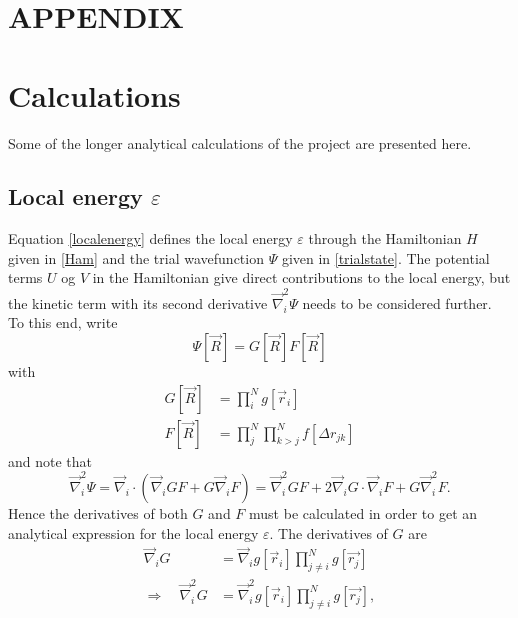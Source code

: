 \documentclass[a4paper,8pt]{article}
\begin{document}




\newpage
\appendix
\setcounter{equation}{0}
\renewcommand{\theequation}{\thesection\arabic{equation}}
\section*{APPENDIX}
\section{Calculations}
Some of the longer analytical calculations of the project are presented here.


\subsection{Local energy $\varepsilon$}\label{derLocalenergy}
Equation \eqref{localenergy} defines the local energy $\varepsilon$ through the Hamiltonian $H$ given in \eqref{Ham} and the trial wavefunction $\Psi$ given in \eqref{trialstate}. The potential terms $U$ og $V$ in the Hamiltonian give direct contributions to the local energy, but the kinetic term with its second derivative $\vec{\nabla}_i^2\Psi$ needs to be considered further. To this end, write
\begin{equation}
\Psi[\vec{R}] = G[\vec{R}]F[\vec{R}]
\end{equation}
with
\begin{align}
G[\vec{R}] &= \prod\limits_i^N g[\vec{r}_i] \label{G}\\
F[\vec{R}] &= \prod\limits_j^N\prod\limits_{k > j}^N f[\Delta{r}_{jk}] \label{F}
\end{align}
and note that
\begin{equation}
\vec{\nabla}_i^2\Psi = \vec{\nabla}_i\cdot\left(\vec{\nabla}_i G F + G \vec{\nabla}_i F\right) = \vec{\nabla}_i^2 G F + 2\vec{\nabla}_i G \cdot \vec{\nabla}_i F + G \vec{\nabla}_i^2 F. \label{Lap_Psi_1} 
\end{equation}
Hence the derivatives of both $G$ and $F$ must be calculated in order to get an analytical expression for the local energy $\varepsilon$. The derivatives of $G$ are 
\begin{align}
\vec{\nabla}_i G &= \vec{\nabla}_i g[\vec{r}_i] \prod\limits_{j \neq i}^N g[\vec{r_j}] \nonumber\\
\Longrightarrow\quad \vec{\nabla}_i^2 G &= \vec{\nabla}_i^2 g[\vec{r}_i] \prod\limits_{j \neq i}^N g[\vec{r_j}], \nonumber
\end{align}
\end{document}
